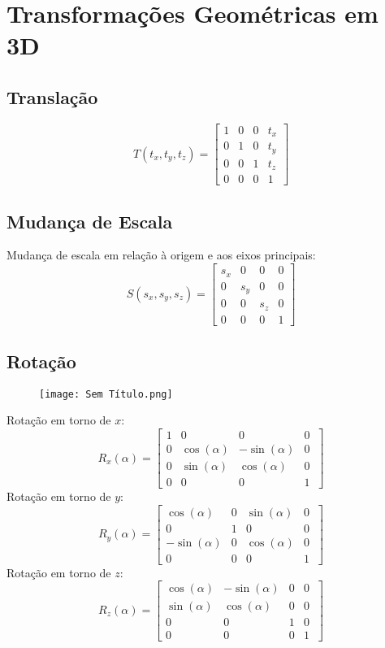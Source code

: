\documentclass[10pt,a4paper]{report}
\begin{document}
\section{Transformações Geométricas em 3D}
\subsection{Translação}
$$
T(t_x, t_y, t_z) = \begin{bmatrix}
1 & 0 & 0 & t_x\\
0 & 1 & 0 & t_y\\
0 & 0 & 1 & t_z\\
0 & 0 & 0 & 1
\end{bmatrix}
$$
\subsection{Mudança de Escala}
Mudança de escala em relação à origem e aos eixos principais:
$$
S(s_x, s_y, s_z) = \begin{bmatrix}
s_x & 0 & 0 & 0\\
0 & s_y & 0 & 0\\
0 & 0 & s_z & 0\\
0 & 0 & 0 & 1
\end{bmatrix}
$$
\subsection{Rotação}
\begin{figure}[H]
\centering
\texttt{[image: Sem Título.png]}
\end{figure}
Rotação em torno de $x$:
$$
R_x(\alpha) = \begin{bmatrix}
1 & 0 & 0 & 0\\
0 & \cos(\alpha) & -\sin(\alpha) & 0\\
0 & \sin(\alpha) & \cos(\alpha) & 0\\
0 & 0 & 0 & 1\
\end{bmatrix}
$$
Rotação em torno de  $y$:
$$
R_y(\alpha) = \begin{bmatrix}
\cos(\alpha) & 0 & \sin(\alpha) & 0\\
0 & 1 & 0 & 0\\
-\sin(\alpha) & 0 & \cos(\alpha) & 0\\
0 & 0 & 0 & 1\
\end{bmatrix}
$$
Rotação em torno de $z$:
$$
R_z(\alpha) = \begin{bmatrix}
\cos(\alpha) & -\sin(\alpha) & 0 & 0\\
\sin(\alpha) & \cos(\alpha) & 0 & 0\\
0 & 0 & 1 & 0\\
0 & 0 & 0 & 1\
\end{bmatrix}
$$
\end{document}
